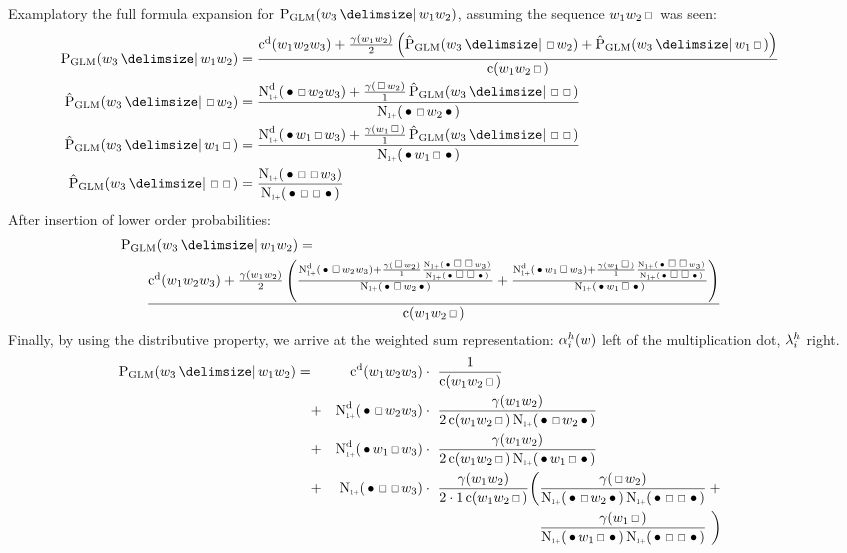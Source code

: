 Examplatory the full formula expansion for $\ProbGLM{w_3}{w_1 w_2}$, assuming
the sequence $w_1 w_2 \Skp$ was seen:
\begin{subequations}
  \begin{align}
    \hspace{-2.5em}\ProbGLM {w_3}{w_1 w_2}   &= \ProbGLMcab{\ProbGLM*{w_3}{\Skp w_2}}{\ProbGLM*{w_3}{w_1 \Skp}} \\
    \hspace{-2.5em}\ProbGLM*{w_3}{\Skp w_2}  &= \ProbGLMcsb{\ProbGLM*{w_3}{\Skp \Skp}} \\
    \hspace{-2.5em}\ProbGLM*{w_3}{w_1 \Skp}  &= \ProbGLMcas{\ProbGLM*{w_3}{\Skp \Skp}} \\
    \hspace{-2.5em}\ProbGLM*{w_3}{\Skp \Skp} &= \ProbGLMcss
  \end{align}
\end{subequations}
After insertion of lower order probabilities:
\begin{align}
  \label{eq:probglmexpansion-inserted}
  \hspace{-2.5em}&\ProbGLM{w_3}{w_1 w_2} =\\
  \hspace{-2.5em}&\qquad \ProbGLMcab{\ProbGLMcsb{\ProbGLMcss}}
                                    {\ProbGLMcas{\ProbGLMcss}} \nonumber
\end{align}
Finally, by using the distributive property, we arrive at the weighted sum
representation: $\alpha^h_i(w)$ left of the multiplication dot,
$\lambda^h_i$ right.
\begin{align}
  \label{eq:probglmexpansion-final}
  \hspace{-2.5em}\ProbGLM {w_3}{w_1 w_2} =
    & & \DiscountedCount (w_1 w_2 w_3)        &             \cdot\  \frac{1}{\Count(w_1 w_2 \Skp)} \\
    &+& \DiscountedCount*(\WSkp \Skp w_2 w_3) &             \cdot\  \frac{\gamma(w_1 w_2)}{2 \Count(w_1 w_2 \Skp) \ContCountIp(\WSkp \Skp w_2 \WSkp)} \nonumber \\
    &+& \DiscountedCount*(\WSkp w_1 \Skp w_3) &             \cdot\  \frac{\gamma(w_1 w_2)}{2 \Count(w_1 w_2 \Skp) \ContCountIp(\WSkp w_1 \Skp \WSkp)} \nonumber \\
    &+& \ContCountIp(\WSkp\Skp \Skp w_3)      &             \cdot\  \frac{\gamma(w_1 w_2)}{2 \cdot 1 \Count(w_1 w_2 \Skp)} \bigg(  \frac{\gamma(\Skp w_2)}{\ContCountIp(\WSkp \Skp w_2 \WSkp) \ContCountIp(\WSkp \Skp \Skp \WSkp)} \: + \nonumber \\
    & &                                       & \phantom{{} \cdot\  \frac{\gamma(w_1 w_2)}{2 \cdot 1 \Count(w_1 w_2 \Skp)} \bigg(} \frac{\gamma(w_1 \Skp)}{\ContCountIp(\WSkp w_1 \Skp \WSkp) \ContCountIp(\WSkp \Skp \Skp \WSkp)} \ \bigg) \nonumber
\end{align}

